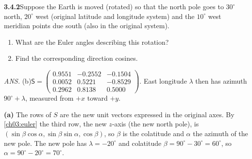 \par\bigskip
\noindent\textbf{3.4.2}\quad Suppose the Earth is moved (rotated) so that the
north pole goes to $30^{\circ}$ north, $20^{\circ}$ west (original latitude
and longitude system) and the $10^{\circ}$ west meridian points due south
(also in the original system).
\begin{enumerate}
\item[(a)] What are the Euler angles describing this rotation?
\item[(b)] Find the corresponding direction cosines.
\end{enumerate}
\par\nobreak\hfill\emph{ANS.}\enspace
(b)\enspace$\mathsf{S}=\begin{pmatrix}
0.9551&-0.2552&-0.1504\\0.0052&0.5221&-0.8529\\
0.2962&0.8138&0.5000\end{pmatrix}$.
\solution
{}
East longitude $\lambda$ then has azimuth $90^\circ+\lambda$,
measured from $+x$ toward $+y$.

\textbf{(a)} The rows of $S$ are the new unit vectors expressed in the
original axes. By \eqref{ch03:euler} the third row, the new $z$-axis
(the new north pole), is
$(\sin\beta\cos\alpha,\sin\beta\sin\alpha,\cos\beta)$, so $\beta$ is
the colatitude and $\alpha$ the azimuth of the new pole.
The new pole has $\lambda=-20^\circ$ and colatitude
$\beta=90^\circ-30^\circ=60^\circ$, so $\alpha=90^\circ-20^\circ=70^\circ$.

